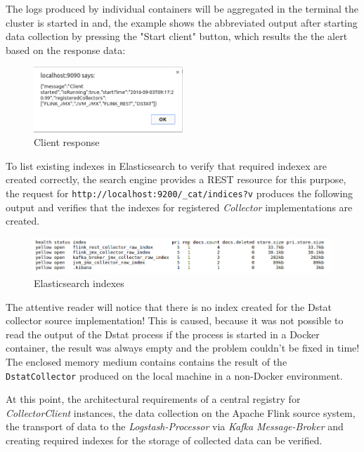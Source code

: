 The logs produced by individual containers will be aggregated in the terminal the cluster is started in and, the example shows the
abbreviated output after starting data collection by pressing the "Start client" button, which results the the alert based on the response data:

\begin{figure}[H]
	\centering
	\includegraphics[width=0.5\textwidth]{../images/11-alert.png}
	\caption{Client response}
	\label{fig:alert}
\end{figure}

To list existing indexes in Elasticsearch to verify that required indexex are created correctly, the search engine provides a
REST resource for this purpose, the request for \verb|http://localhost:9200/_cat/indices?v| produces the following output and verifies
that the indexes for registered \textit{Collector} implementations are created.
\begin{figure}[H]
	\centering
	\includegraphics[width=1.0\textwidth]{../images/12-indexes.png}
	\caption{Elasticsearch indexes}
	\label{fig:indexes}
\end{figure}

The attentive reader will notice that there is no index created for the Dstat collector source implementation! This is caused, because
it was not possible to read the output of the Dstat process if the process is started in a Docker container, the result was always empty
and the problem couldn't be fixed in time! The enclosed memory medium contains contains the result of the \verb|DstatCollector| produced
on the local machine in a non-Docker environment.

At this point, the architectural requirements of a central registry for \textit{CollectorClient} instances, the data collection on the
Apache Flink source system, the transport of data to the \textit{Logstash-Processor} via \textit{Kafka Message-Broker} and creating required
indexes for the storage of collected data can be verified.

